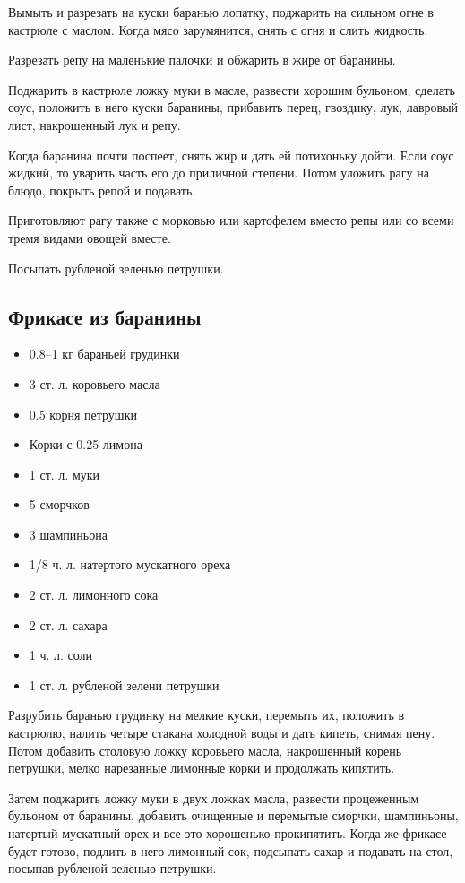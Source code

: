 Вымыть и разрезать на куски баранью лопатку, поджарить на сильном огне в кастрюле с маслом. Когда мясо зарумянится, снять с огня и слить жидкость.

Разрезать репу на маленькие палочки и обжарить в жире от баранины.

Поджарить в кастрюле ложку муки в масле, развести хорошим бульоном, сделать соус, положить в него куски баранины, прибавить перец, гвоздику, лук, лавровый лист, накрошенный лук и репу.

Когда баранина почти поспеет, снять жир и дать ей потихоньку дойти. Если соус жидкий, то уварить часть его до приличной степени. Потом уложить рагу на блюдо, покрыть репой и подавать.

Приготовляют рагу также с морковью или картофелем вместо репы или со всеми тремя видами овощей вместе.

Посыпать рубленой зеленью петрушки.

\subsection{Фрикасе из баранины}

\begin{itemize}
	\item 0.8–1 кг бараньей грудинки
    \item 3 ст. л. коровьего масла 
    \item 0.5 корня петрушки
    \item Корки с 0.25 лимона
    \item 1 ст. л. муки
    \item 5 сморчков
    \item 3 шампиньона 
    \item 1/8 ч. л. натертого мускатного ореха 
    \item 2 ст. л. лимонного сока
    \item 2 ст. л. сахара
    \item 1 ч. л. соли
    \item 1 ст. л. рубленой зелени петрушки
\end{itemize}

Разрубить баранью грудинку на мелкие куски, перемыть их, положить в кастрюлю, налить четыре стакана холодной воды и дать кипеть, снимая пену. Потом добавить столовую ложку коровьего масла, накрошенный корень петрушки, мелко нарезанные лимонные корки и продолжать кипятить.

Затем поджарить ложку муки в двух ложках масла, развести процеженным бульоном от баранины, добавить очищенные и перемытые сморчки, шампиньоны, натертый мускатный орех и все это хорошенько прокипятить. Когда же фрикасе будет готово, подлить в него лимонный сок, подсыпать сахар и подавать на стол, посыпав рубленой зеленью петрушки.

